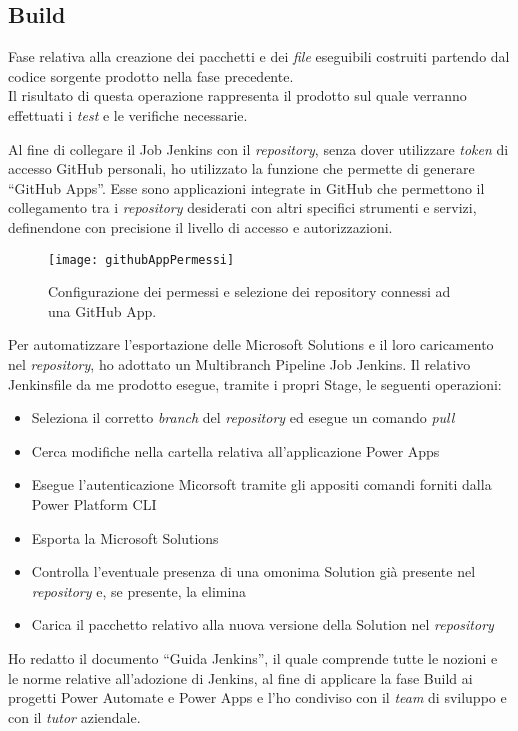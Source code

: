 \subsection{Build}
Fase relativa alla creazione dei pacchetti e dei \emph{file} eseguibili costruiti partendo dal codice sorgente prodotto nella fase precedente.\\
Il risultato di questa operazione rappresenta il prodotto sul quale verranno effettuati i \emph{test} e le verifiche necessarie. 

Al fine di collegare il Job Jenkins con il \emph{repository}, senza dover utilizzare \emph{token} di accesso GitHub personali, ho utilizzato la funzione che permette di generare “GitHub Apps”.
Esse sono applicazioni integrate in GitHub che permettono il collegamento tra i \emph{repository} desiderati con altri specifici strumenti e servizi, definendone con precisione il livello di accesso e autorizzazioni.  
\begin{figure}[htbp] 
    \centering 
    \texttt{[image: githubAppPermessi]} 
    \caption{Configurazione dei permessi e selezione dei repository connessi ad una GitHub App.}
    \label{fig:githubAppPermessi}
\end{figure}
\newline Per automatizzare l'esportazione delle Microsoft Solutions e il loro caricamento nel \emph{repository}, ho adottato un Multibranch Pipeline Job Jenkins. Il relativo Jenkinsfile da me prodotto esegue, tramite i propri Stage, le seguenti operazioni:
\begin{itemize}
    \item Seleziona il corretto \emph{branch} del \emph{repository} ed esegue un comando \emph{pull}
    \item Cerca modifiche nella cartella relativa all'applicazione Power Apps
    \item Esegue l'autenticazione Micorsoft tramite gli appositi comandi forniti dalla Power Platform CLI
    \item Esporta la Microsoft Solutions
    \item Controlla l'eventuale presenza di una omonima Solution già presente nel \emph{repository} e, se presente, la elimina 
    \item Carica il pacchetto relativo alla nuova versione della Solution nel \emph{repository}
\end{itemize}
Ho redatto il documento “Guida Jenkins”, il quale comprende tutte le nozioni e le norme relative all'adozione di Jenkins, al fine di applicare la fase Build ai progetti Power Automate e Power Apps e l'ho condiviso con il \emph{team} di sviluppo e con il \emph{\emph{tutor}} aziendale.

